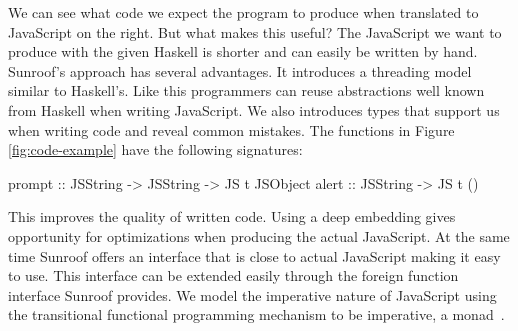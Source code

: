 We can see what code we expect the program to produce when 
translated to JavaScript on the right. But what makes 
this useful? The JavaScript we want to produce with the given
Haskell is shorter and can easily be written by hand.
Sunroof's approach has several advantages. It introduces a 
threading model similar
to Haskell's. Like this programmers can reuse abstractions
well known from Haskell when writing JavaScript.
We also introduces types that support us when 
writing code and reveal common mistakes. The functions
in Figure \ref{fig:code-example} have the following signatures:
\begin{Code}
prompt :: JSString -> JSString -> JS t JSObject
alert  :: JSString -> JS t ()
\end{Code}
This improves the quality of written code.
Using a deep embedding gives opportunity 
for optimizations when producing the actual JavaScript.
At the same time Sunroof offers an interface that is 
close to actual JavaScript making it easy to use.
This interface can be extended easily through
the foreign function interface Sunroof provides.
We model the imperative nature of JavaScript
using the transitional functional programming 
mechanism to be imperative, a monad~\cite{Moggi:91:ComputationMonads}.

